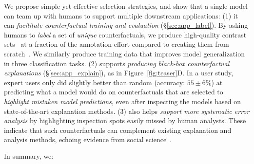 We propose simple yet effective selection strategies, and show that a single \sysname model can team up with humans to support multiple downstream applications:
(1) it can \emph{facilitate counterfactual training and evaluation} (\S\ref{sec:app_label}). 
By asking humans to \emph{label} a set of \emph{unique} counterfactuals, we produce high-quality contrast sets~\cite{gardner2020contrast} at a fraction of the annotation effort compared to creating them from scratch~\cite{kaushik2019learning}.
We similarly produce training data that improves model generalization in three classification tasks. %
(2) \sysname supports \emph{producing black-box counterfactual explanations} (\S\ref{sec:app_explain}), as in Figure~\ref{fig:teaser}D.
In a user study, expert users only did slightly better than random (accuracy: $55 \pm 6\%$) at predicting what a model would do on \sysname counterfactuals that are selected to \emph{highlight mistaken model predictions}, even after inspecting the models based on state-of-the-art explanation methods.
(3) \sysname also helps \emph{support more systematic error analysis} by highlighting inspection spots easily missed by human analysts. 
These indicate that such counterfactuals can complement existing explanation and analysis methods, echoing evidence from social science~\cite{miller}. 

In summary, we:


